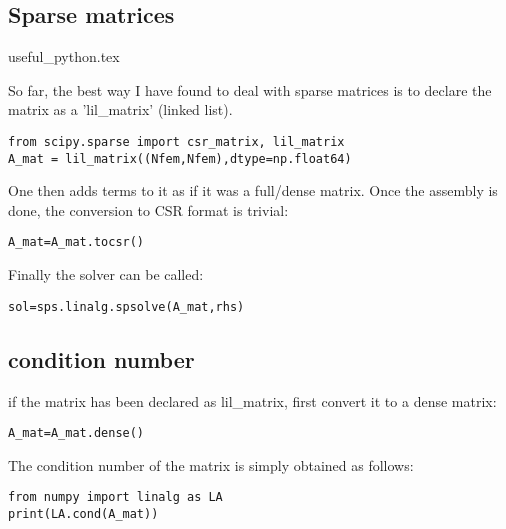 \subsection{Sparse matrices}
\begin{flushright} {\tiny {\color{gray} useful\_python.tex}} \end{flushright}

So far, the best way I have found to deal with sparse matrices is to 
declare the matrix as a 'lil\_matrix' (linked list).

\begin{lstlisting}
from scipy.sparse import csr_matrix, lil_matrix
A_mat = lil_matrix((Nfem,Nfem),dtype=np.float64)
\end{lstlisting}

One then adds terms to it as if it was a full/dense matrix. 
Once the assembly is done, the conversion to CSR format is trivial:

\begin{lstlisting}
A_mat=A_mat.tocsr()
\end{lstlisting}

Finally the solver can be called:

\begin{lstlisting}
sol=sps.linalg.spsolve(A_mat,rhs)
\end{lstlisting}

\subsection{condition number}

if the matrix has been declared as lil\_matrix, first convert it to a dense matrix:
\begin{lstlisting}
A_mat=A_mat.dense()
\end{lstlisting}
The condition number of the matrix is simply obtained as follows:
\begin{lstlisting}
from numpy import linalg as LA
print(LA.cond(A_mat))
\end{lstlisting}

